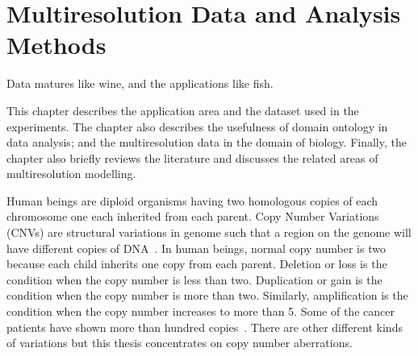 \chapter{Multiresolution Data and Analysis Methods}
\label{ch:analysismultires}

\begin{fquote} Data matures like wine, and the applications like
fish.  \end{fquote} 


\begin{synopsis}
This chapter describes the application area
and the dataset used in the experiments. The chapter also describes
the usefulness of domain ontology in data analysis; and the  
multiresolution data in the domain of  biology. 
Finally, the chapter also briefly reviews the 
literature and discusses the related areas of multiresolution 
modelling.
\end{synopsis}


Human beings are diploid organisms having two homologous copies of each 
chromosome one each inherited from each parent. 
Copy Number Variations (CNVs) are structural variations in genome
such that a region on the genome will have different copies of 
DNA~\cite{stankiewicz2010}. In human beings, normal copy number 
is two because each child inherits one copy from each parent. Deletion
or loss is the condition when the copy number is less than two. 
Duplication or gain is the condition when the copy number is 
more than two. Similarly, amplification is the condition when 
the copy number increases to more than 5. Some of the cancer 
patients have shown more than hundred copies~\cite{vogelstein2002}.
There are other different kinds of variations but this thesis  
concentrates on copy number aberrations. 


